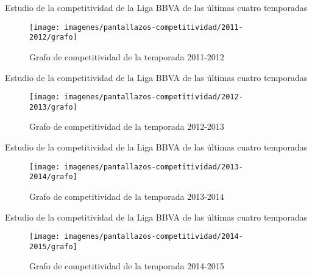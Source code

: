\documentclass[10pt]{beamer}
\begin{document}
	\begin{frame}{Estudio de la competitividad de la Liga BBVA de las últimas cuatro temporadas}	
		\begin{figure}
			\centering
			\texttt{[image: imagenes/pantallazos-competitividad/2011-2012/grafo]}
			\caption{Grafo de competitividad de la temporada 2011-2012}
			\label{fig:2011-2012}
		\end{figure}
	\end{frame}
	
	\begin{frame}{Estudio de la competitividad de la Liga BBVA de las últimas cuatro temporadas}	
		\begin{figure}
			\centering
			\texttt{[image: imagenes/pantallazos-competitividad/2012-2013/grafo]}
			\caption{Grafo de competitividad de la temporada 2012-2013}
			\label{fig:2012-2013}
		\end{figure}
	\end{frame}
	
	\begin{frame}{Estudio de la competitividad de la Liga BBVA de las últimas cuatro temporadas}	
		\begin{figure}
			\centering
			\texttt{[image: imagenes/pantallazos-competitividad/2013-2014/grafo]}
			\caption{Grafo de competitividad de la temporada 2013-2014}
			\label{fig:2013-2014}
		\end{figure}
	\end{frame}
	
	\begin{frame}{Estudio de la competitividad de la Liga BBVA de las últimas cuatro temporadas}	
		\begin{figure}
			\centering
			\texttt{[image: imagenes/pantallazos-competitividad/2014-2015/grafo]}
			\caption{Grafo de competitividad de la temporada 2014-2015}
			\label{fig:2014-2015}
		\end{figure}
	\end{frame}
	
\end{document}
